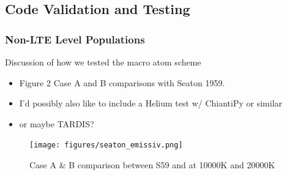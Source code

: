 \documentclass[preprint, a4paper, 11pt]{aastex}
\begin{document}
\subsection{Code Validation and Testing}


\subsubsection{Non-LTE Level Populations}

Discussion of how we tested the macro atom scheme
\begin{itemize}
\item Figure 2 Case A and B comparisons with Seaton 1959. 
\item I'd possibly also like to include a Helium test w/ ChiantiPy or similar 
\item or maybe TARDIS?
\end{itemize}


\begin{figure}[!h]
\centering
\texttt{[image: figures/seaton\_emissiv.png]}
\caption{Case A \& B comparison between S59 and \py at 10000K and 20000K}
\label{seaton}
\end{figure}
\end{document}
